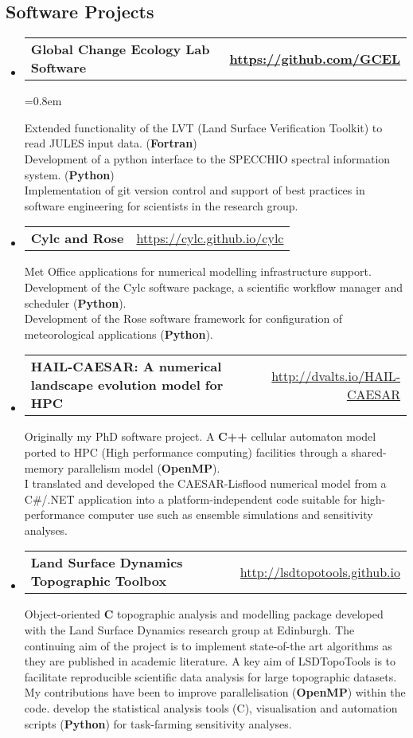 \documentclass[10.5pt,a4]{article}
\makeatletter
\newcommand{\headerrow}[2]
{\begin{tabular*}{\linewidth}{l@{\extracolsep{\fill}}r}
	#1 &
	#2 \\
\end{tabular*}}
\newcommand{\CPP}
{C\nolinebreak[4]\hspace{-.05em}\raisebox{.22ex}{\footnotesize\bf ++}}
\makeatother
\begin{document}
\subsection*{Software Projects}
\begin{itemize}
	\parskip=0.1em
	
	\item
	\headerrow
		{\textbf{Global Change Ecology Lab Software}}
		{\textbf{\url{https://github.com/GCEL}}}

		\parskip=0.8em

		 Extended functionality of the LVT (Land Surface Verification Toolkit) to read JULES input data. (\textbf{Fortran}) \\
		 Development of a python interface to the SPECCHIO spectral information system. (\textbf{Python}) \\
		 Implementation of git version control and support of best practices in software engineering for scientists in the research group.

	\item
	\headerrow
		{\textbf{Cylc and Rose}}
		{\url{https://cylc.github.io/cylc}}

		Met Office applications for numerical modelling infrastructure support. \\
		Development of the Cylc software package, a scientific workflow manager and scheduler (\textbf{Python}). \\ 
		Development of the Rose software framework for configuration of meteorological applications (\textbf{Python}). 

	\item
	\headerrow
		{\textbf{HAIL-CAESAR: A numerical landscape evolution model for HPC}}
		{\url{http://dvalts.io/HAIL-CAESAR}}

		Originally my PhD software project. A \textbf{C++} cellular automaton model ported to HPC (High performance computing) facilities through a shared-memory parallelism model (\textbf{OpenMP}). \\
		I translated and developed the CAESAR-Lisflood numerical model from a C{\#}/.NET application into a platform-independent code suitable for high-performance computer use such as ensemble simulations and sensitivity analyses. 


	\item
	\headerrow
		{\textbf{Land Surface Dynamics Topographic Toolbox}}
		{\url{http://lsdtopotools.github.io}}

		Object-oriented \textbf{{\CPP}} topographic analysis and modelling package developed with the Land Surface Dynamics research group at Edinburgh. The continuing aim of the project is to implement state-of-the art algorithms as they are published in academic literature. A key aim of LSDTopoTools is to facilitate reproducible scientific data analysis for large topographic datasets. \\
		My contributions have been to improve parallelisation (\textbf{OpenMP}) within the code. develop the statistical analysis tools (\CPP), visualisation and automation scripts (\textbf{Python}) for task-farming sensitivity analyses.


\end{itemize}
\end{document}
